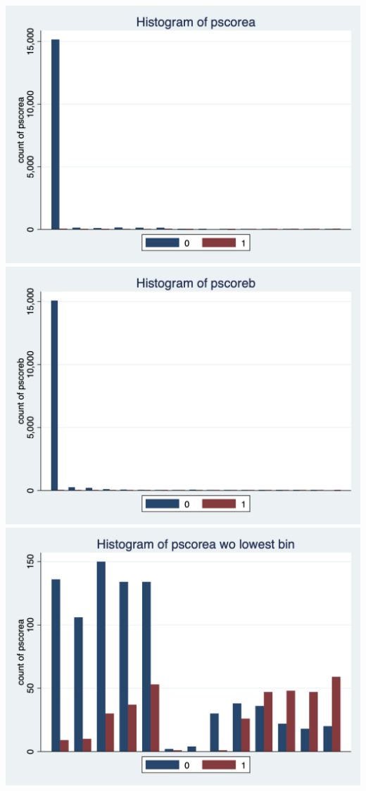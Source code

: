 \documentclass{article}
\begin{document}
\begin{center}
\includegraphics[scale = 0.5]{figure_5a}
\includegraphics[scale = 0.5]{figure_5b}
\includegraphics[scale = 0.5]{figure_5a_2}

\end{center}
\end{document}
